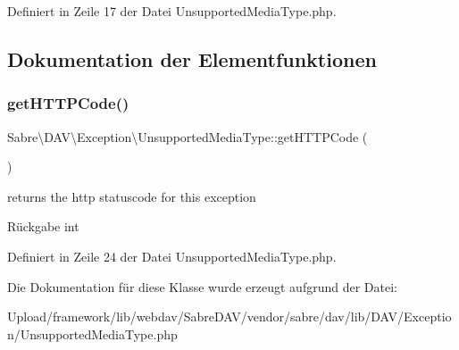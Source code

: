 Definiert in Zeile 17 der Datei Unsupported\+Media\+Type.\+php.



\subsection{Dokumentation der Elementfunktionen}
\mbox{\label{class_sabre_1_1_d_a_v_1_1_exception_1_1_unsupported_media_type_a01f8e84771e8b084107921ed18a36b50}} 
\subsubsection{\texorpdfstring{get\+H\+T\+T\+P\+Code()}{getHTTPCode()}}
{\footnotesize\ttfamily Sabre\textbackslash{}\+D\+A\+V\textbackslash{}\+Exception\textbackslash{}\+Unsupported\+Media\+Type\+::get\+H\+T\+T\+P\+Code (\begin{DoxyParamCaption}{ }\end{DoxyParamCaption})}

returns the http statuscode for this exception

\begin{DoxyReturn}{Rückgabe}
int 
\end{DoxyReturn}


Definiert in Zeile 24 der Datei Unsupported\+Media\+Type.\+php.



Die Dokumentation für diese Klasse wurde erzeugt aufgrund der Datei\+:\begin{DoxyCompactItemize}
\item 
Upload/framework/lib/webdav/\+Sabre\+D\+A\+V/vendor/sabre/dav/lib/\+D\+A\+V/\+Exception/Unsupported\+Media\+Type.\+php\end{DoxyCompactItemize}
